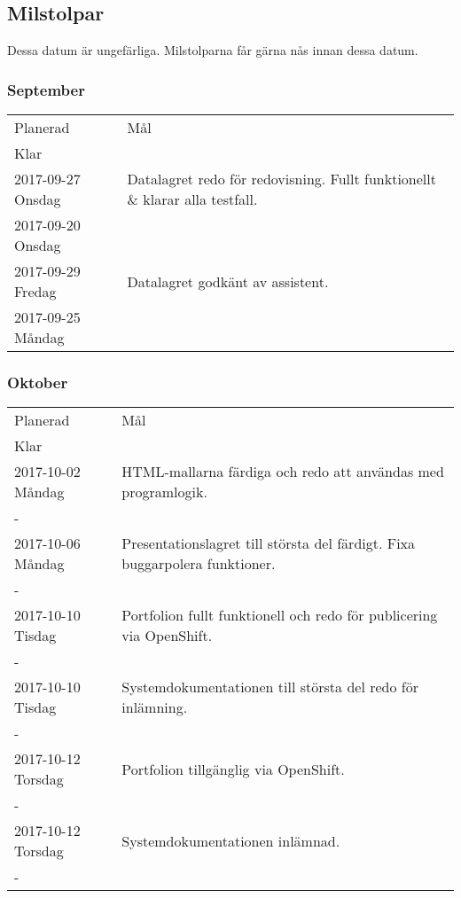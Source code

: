 \documentclass{TDP003mall}
\begin{document}
\subsection{Milstolpar}
  Dessa datum är ungefärliga. Milstolparna får gärna nås innan dessa datum.

\subsubsection{September}
  \begin{tabular}{ l|l }
    \hline
    Planerad & Mål\\Klar\\
    \hline
    \hline
    2017-09-27 Onsdag & Datalagret redo för redovisning. Fullt funktionellt \& klarar alla testfall.\\2017-09-20 Onsdag\\
    \hline
    2017-09-29 Fredag & Datalagret godkänt av assistent.\\2017-09-25 Måndag\\
    \hline
  \end{tabular}

\subsubsection{Oktober}
  \begin{tabular}{ l|l }
    \hline
    Planerad & Mål\\Klar\\
    \hline
    \hline
    2017-10-02 Måndag &	HTML-mallarna färdiga och redo att användas med programlogik.\\-\\
    \hline
    2017-10-06 Måndag & Presentationslagret till största del färdigt. Fixa buggar\/polera funktioner.\\-\\
    \hline
    2017-10-10 Tisdag &	Portfolion fullt funktionell och redo för publicering via OpenShift.\\-\\
    \hline
    2017-10-10 Tisdag &	Systemdokumentationen till största del redo för inlämning.\\-\\
    \hline
    2017-10-12 Torsdag & Portfolion tillgänglig via OpenShift.\\-\\
    \hline
    2017-10-12 Torsdag &	Systemdokumentationen inlämnad.\\-\\
    \hline
  \end{tabular}
\end{document}
